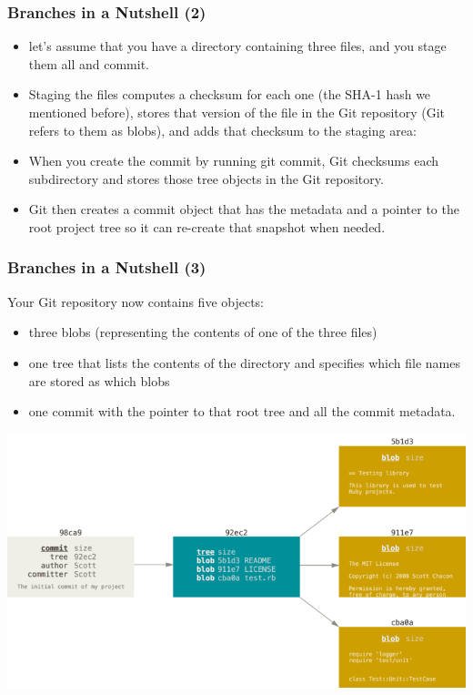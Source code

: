 \begin{frame}
  \frametitle{Branches in a Nutshell (2)}
  \begin{itemize}
  \item let’s assume that you have a directory containing three files, and you stage them all and commit.
  \item Staging the files computes a checksum for each one (the SHA-1 hash we mentioned before), stores that version of the file in the Git repository (Git refers to them as blobs), and adds that checksum to the staging area:
  \end{itemize}
\gitcommit
  \begin{itemize}
  \item When you create the commit by running git commit, Git checksums each subdirectory and stores those tree objects in the Git repository. 
  \item Git then creates a commit object that has the metadata and a pointer to the root project tree so it can re-create that snapshot when needed.
  \end{itemize}
\end{frame}

\begin{frame}
  \frametitle{Branches in a Nutshell (3)}
  Your Git repository now contains five objects:
  \begin{itemize}
  \item three blobs (representing the contents of one of the three files)
  \item one tree that lists the contents of the directory and specifies which file names are stored as which blobs
  \item one commit with the pointer to that root tree and all the commit metadata.
  \end{itemize}
  \vspace{-1em}
  \begin{center}
    \includegraphics[width=0.9\linewidth]{figures/commit-and-tree}
  \end{center}
\end{frame}

